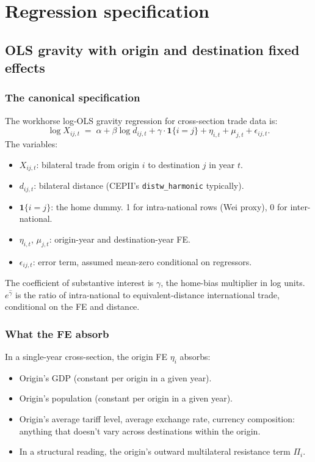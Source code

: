 \documentclass[11pt,letterpaper,oneside]{book}
\theoremstyle{definition}
\theoremstyle{remark}
\begin{document}
\part{Regression specification}

\chapter{OLS gravity with origin and destination fixed effects}
\label{ch:ols-gravity}

\section{The canonical specification}

The workhorse log-OLS gravity regression for cross-section trade data
is:
\begin{equation}
\label{eq:gravity}
\log X_{ij,t} \;=\; \alpha + \beta \log d_{ij,t} + \gamma \cdot \mathbf{1}\{i = j\} + \eta_{i,t} + \mu_{j,t} + \epsilon_{ij,t}.
\end{equation}
The variables:
\begin{itemize}
  \item $X_{ij,t}$: bilateral trade from origin $i$ to destination $j$ in year $t$.
  \item $d_{ij,t}$: bilateral distance (CEPII's \texttt{distw\_harmonic} typically).
  \item $\mathbf{1}\{i=j\}$: the home dummy. 1 for intra-national rows
    (Wei proxy), 0 for inter-national.
  \item $\eta_{i,t}$, $\mu_{j,t}$: origin-year and destination-year FE.
  \item $\epsilon_{ij,t}$: error term, assumed mean-zero conditional on regressors.
\end{itemize}

The coefficient of substantive interest is $\gamma$, the home-bias
multiplier in log units. $e^{\hat{\gamma}}$ is the ratio of
intra-national to equivalent-distance international trade, conditional
on the FE and distance.

\section{What the FE absorb}

In a single-year cross-section, the origin FE $\eta_i$ absorbs:
\begin{itemize}
  \item Origin's GDP (constant per origin in a given year).
  \item Origin's population (constant per origin in a given year).
  \item Origin's average tariff level, average exchange rate, currency
    composition: anything that doesn't vary across destinations within
    the origin.
  \item In a structural reading, the origin's outward multilateral
    resistance term $\Pi_i$.
\end{itemize}
\end{document}
